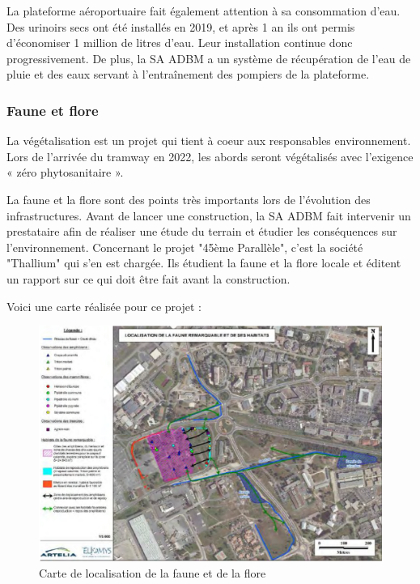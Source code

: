 La plateforme aéroportuaire fait également attention à sa consommation d'eau. Des urinoirs secs ont été installés en 2019, et après 1 an ils ont permis d'économiser 1 million de litres d'eau. Leur installation continue donc progressivement.
De plus, la SA ADBM a un système de récupération de l'eau de pluie et des eaux servant à l'entraînement des pompiers de la plateforme.

\subsubsection{Faune et flore}

La végétalisation est un projet qui tient à coeur aux responsables environnement. Lors de l'arrivée du tramway en 2022, les abords seront végétalisés avec l'exigence « zéro phytosanitaire ».\newline


La faune et la flore sont des points très importants lors de l'évolution des infrastructures. Avant de lancer une construction, la SA ADBM fait intervenir un prestataire afin de réaliser une étude du terrain et étudier les conséquences sur l'environnement.
Concernant le projet "45ème Parallèle", c'est la société "Thallium" qui s'en est chargée. Ils étudient la faune et la flore locale et éditent un rapport sur ce qui doit être fait avant la construction.\newline

Voici une carte réalisée pour ce projet :

\begin{figure}[hbt!]
  \centering
  \includegraphics[width=13cm]{Images/carteenvironnement.png}
  \caption{Carte de localisation de la faune et de la flore}
  \label{fig:crapeau}
\end{figure}

